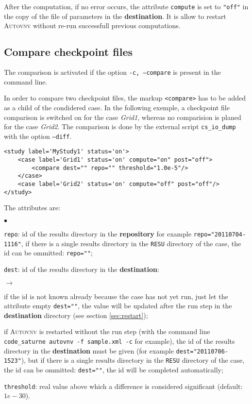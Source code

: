 \documentclass[a4paper,10pt,twoside]{article}
\begin{document}
After the computation, if no error occurs, the attribute \texttt{compute} is set
to \texttt{"off"} in the copy of the file of parameters in the
\textbf{destination}. It is allow to restart \textsc{Autovnv} without re-run
successfull previous computations.

\subsection{Compare checkpoint files}

The comparison is activated if the option \texttt{-c, --compare} is present in
the command line.

In order to compare two checkpoint files, the markup \texttt{<compare>} has to
be added as a child of the condidered case. In the following exemple, a
checkpoint file comparison is switched on for the case \textit{Grid1}, whereas
no comparision is planed for the case \textit{Grid2}. The comparison is done by
the external script \texttt{cs\_io\_dump} with the option \texttt{--diff}.

\begin{verbatim}
<study label='MyStudy1' status='on'>
    <case label='Grid1' status='on' compute="on" post="off">
        <compare dest="" repo="" threshold="1.0e-5"/>
    </case>
    <case label='Grid2' status='on' compute="off" post="off"/>
</study>
\end{verbatim}

The attributes are:
\begin{list}{$\bullet$}{}

\item \texttt{repo}: id of the results directory in the \textbf{repository} for
example \texttt{repo="20110704-1116"}, if there is a single results directory
in the \texttt{RESU} directory of the case, the id can be ommitted:
\texttt{repo=""};

\item \texttt{dest}: id of the results directory in the \textbf{destination}:
\begin{list}{$\rightarrow$}{}
\item if the id is not known already because the case has not yet run, just let
the attribute empty \texttt{dest=""}, the value will be updated after the run
step in the \textbf{destination} directory (see section \ref{sec:restart});
\item if \textsc{Autovnv} is restarted without the run step (with the command
line \texttt{code\_saturne autovnv -f sample.xml -c} for example), the id of
the results directory in the \textbf{destination} must be given (for example
\texttt{dest="20110706-1523"}), but if there is a single results directory in
the \texttt{RESU} directory of the case, the id can be ommitted:
\texttt{dest=""}, the id will be completed automatically;
\end{list}

\item \texttt{threshold}: real value above which a difference is considered
significant (default: $1e-30$).
\end{list}
\end{document}
